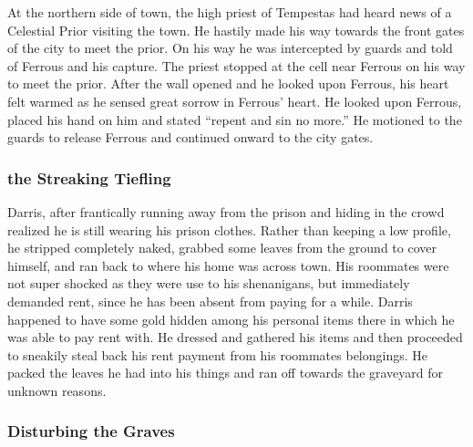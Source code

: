 At the northern side of town, the high priest of Tempestas had heard news of a Celestial Prior visiting the town. He hastily made his way towards the front gates of the city to meet the prior. On his way he was intercepted by guards and told of Ferrous and his capture. The priest stopped at the cell near Ferrous on his way to meet the prior. After the wall opened and he looked upon Ferrous, his heart felt warmed as he sensed great sorrow in Ferrous' heart. He looked upon Ferrous, placed his hand on him and stated ``repent and sin no more.'' He motioned to the guards to release Ferrous and continued onward to the city gates.

\subsubsection{the Streaking Tiefling}

Darris, after frantically running away from the prison and hiding in the crowd realized he is still wearing his prison clothes. Rather than keeping a low profile, he stripped completely naked, grabbed some leaves from the ground to cover himself, and ran back to where his home was across town. His roommates were not super shocked as they were use to his shenanigans, but immediately demanded rent, since he has been absent from paying for a while. Darris happened to have some gold hidden among his personal items there in which he was able to pay rent with. He dressed and gathered his items and then proceeded to sneakily steal back his rent payment from his roommates belongings. He packed the leaves he had into his things and ran off towards the graveyard for unknown reasons.

\subsubsection{Disturbing the Graves}

